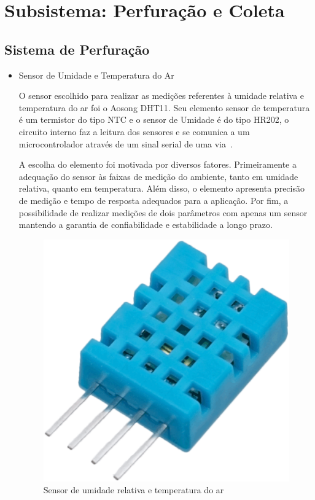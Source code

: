 \section{Subsistema: Perfuração e Coleta}

  \subsection{Sistema de Perfuração}

  \begin{itemize}

  \item Sensor de Umidade e Temperatura do Ar

  O sensor escolhido para realizar as medições referentes à umidade relativa e
  temperatura do ar foi o Aosong DHT11. Seu elemento sensor de temperatura é um
  termistor do tipo NTC e o sensor de Umidade é do tipo HR202, o circuito interno
  faz a leitura dos sensores e se comunica a um microcontrolador através de um
  sinal serial de uma via~\cite{AOSONG}.

  A escolha do elemento foi motivada por diversos fatores. Primeiramente a
  adequação do sensor às faixas de medição do ambiente, tanto em umidade
  relativa, quanto em temperatura. Além disso, o elemento apresenta precisão de
  medição e tempo de resposta adequados para a aplicação.  Por fim, a
  possibilidade de realizar medições de dois parâmetros com apenas um sensor
  mantendo a garantia de confiabilidade e estabilidade a longo prazo.

  \begin{figure}[!htbp]
  \begin{center}
  \includegraphics[keepaspectratio=true,scale=0.1]{figuras/dht-11.eps}
  \caption{\label{DHT11}Sensor de umidade relativa e temperatura do ar}
  \end{center}
  \end{figure}


\end{itemize}
